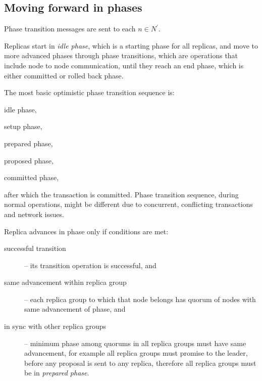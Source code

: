 





\subsection{Moving forward in phases}
Phase transition messages are sent to each $n\in \mathit{N}^'$.

Replicas start in \emph{idle phase}, which is a starting phase for all replicas, and move to more advanced phases through phase transitions, which are operations that include node to node communication, until they reach an end phase, which is either committed or rolled back phase.

The most basic optimistic phase transition sequence is: \begin{enumerate*} \item idle phase, \item setup phase, \item prepared phase, \item proposed phase, \item committed phase, \end{enumerate*} after which the transaction is committed. Phase transition sequence, during normal operations, might be different due to concurrent, conflicting transactions and network issues.


Replica advances in phase only if conditions are met: \begin{description}
\item[successful transition] -- its transition operation is successful, and
\item[same advancement within replica group] -- each replica group to which that node belongs has quorum of nodes with same advancement of phase, and
\item[in sync with other replica groups] -- minimum phase among quorums in all replica groups must have same advancement, for example all replica groups must promise to the leader, before any proposal is sent to any replica, therefore all replica groups must be in \emph{prepared phase}.
\end{description}


